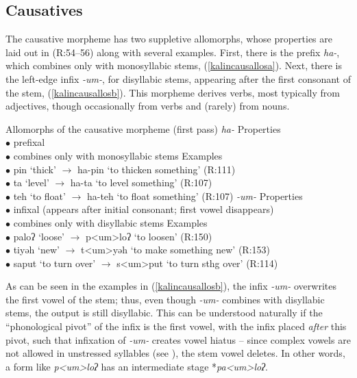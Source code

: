 \documentclass[output=paper]{langscibook}
\begin{document}
\subsection{Causatives}\label{sec:kalin:3.1}

The causative morpheme has two suppletive allomorphs, whose properties are laid out in \Next (R:54--56) along with several examples. First, there is the prefix  \textit{ha-}, which combines only with monosyllabic stems, (\ref{kalincausallosa}). Next, there is the left-edge infix \textit{-um-}, for disyllabic stems, appearing after the first consonant of the stem, (\ref{kalincausallosb}). This morpheme derives verbs, most typically from adjectives, though occasionally from verbs and (rarely) from nouns.

\ea Allomorphs of the causative morpheme (first pass) \label{kalincausallos}
\ea \textit{ha-}\label{kalincausallosa}
\ea  Properties\\
$\bullet$ prefixal\\
$\bullet$ combines only with monosyllabic stems
\ex Examples\\
$\bullet$ pin `thick' $\rightarrow$ ha-pin `to thicken something' \hfill (R:111)\\
$\bullet$ ta `level' $\rightarrow$ ha-ta `to level something' \hfill (R:107)\\
$\bullet$ teh `to float' $\rightarrow$ ha-teh `to float something' \hfill (R:107)
\z
\ex \textit{-um-} \label{kalincausallosb}
\ea Properties\\
$\bullet$ infixal (appears after initial consonant; first vowel disappears)\\
$\bullet$ combines only with disyllabic stems
\ex Examples\\
$\bullet$ paloʔ `loose' $\rightarrow$ p<um>loʔ `to loosen' \hfill (R:150)\\
$\bullet$ tiyəh `new' $\rightarrow$ t<um>yəh `to make something new' \hfill (R:153)\\
$\bullet$ saput `to turn over' $\rightarrow$ s<um>put `to turn sthg over' \hfill (R:114)
\z
\z
\z

As can be seen in the examples in (\ref{kalincausallosb}), the infix \textit{-um-} overwrites the first vowel of the stem; thus, even though \textit{-um-} combines with disyllabic stems, the output is still disyllabic. This can be understood naturally if the ``phonological pivot'' \citep{Yu07} of the infix is the first vowel, with the infix placed {\it after} this pivot, such that infixation of \textit{-um-} creates vowel hiatus -- since complex vowels are not allowed in unstressed syllables (see ), the stem vowel deletes. In other words, a form like \textit{p<um>loʔ} has an intermediate stage *\textit{pa<um>loʔ}.
\end{document}
